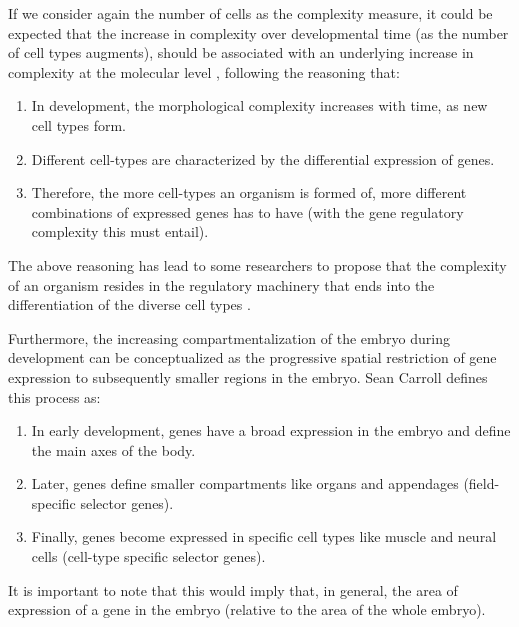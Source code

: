 If we consider again the number of cells as the complexity measure, it could be expected that the increase in complexity over developmental time (as the number of cell types augments), should be associated with an underlying increase in complexity at the molecular level \citep{Arthur2010}, following the reasoning that:

\begin{enumerate}
\item In development, the morphological complexity increases with time, as new cell types form.
\item Different cell-types are characterized by the differential expression of genes.
\item Therefore, the more cell-types an organism is formed of, more different combinations of expressed genes has to have (with the gene regulatory complexity this must entail).
\end{enumerate}

The above reasoning has lead to some researchers to propose that the complexity of an organism resides in the regulatory machinery that ends into the differentiation of the diverse cell types \citep{Davidson2001}. 

Furthermore, the increasing compartmentalization of the embryo during development can be conceptualized as the progressive spatial restriction of gene expression to subsequently smaller regions in the embryo.
Sean Carroll defines this process\citep{Carroll2001} as:
\begin{enumerate}
\item In early development, genes have a broad expression in the embryo and define the main axes of the body.
\item Later, genes define smaller compartments like organs and appendages (field-specific selector genes).
\item Finally, genes become expressed in specific cell types like muscle and neural cells (cell-type specific selector genes). 
\end{enumerate}
It is important to note that this would imply that, in general, the area of expression of a gene in the embryo (relative to the area of the whole embryo).

